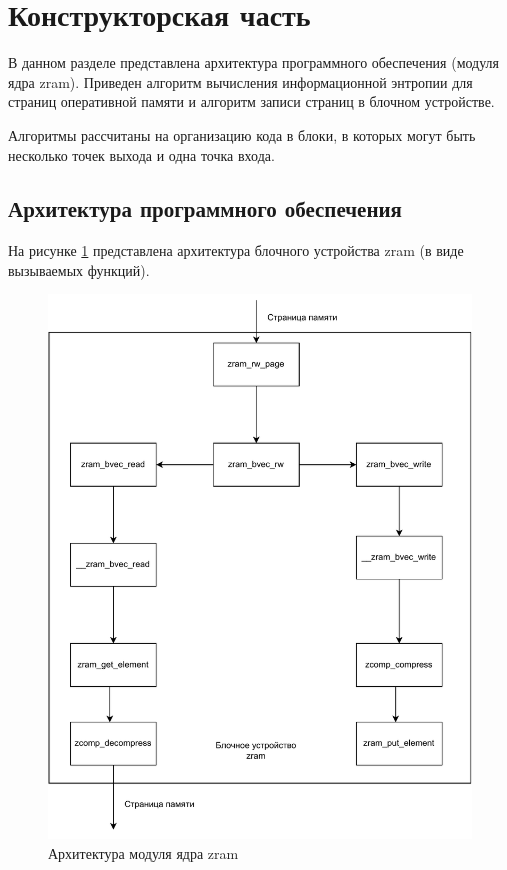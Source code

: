 \section{Конструкторская часть}

В данном разделе представлена архитектура программного обеспечения (модуля ядра zram). Приведен алгоритм вычисления информационной энтропии для страниц оперативной памяти и алгоритм записи страниц в блочном устройстве.

Алгоритмы рассчитаны на организацию кода в блоки, в которых могут быть несколько точек выхода и одна точка входа.

\subsection{Архитектура программного обеспечения}

На рисунке \ref{fig:zram-archeticture} представлена архитектура блочного устройства zram (в виде вызываемых функций).

\begin{figure}[h]
	\centering
	\includegraphics[scale=1]{img/zram-arch.pdf}
	\caption{Архитектура модуля ядра zram}
	\label{fig:zram-archeticture}
\end{figure}

